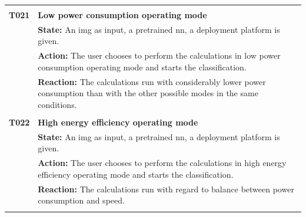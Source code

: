 \documentclass[parskip=full]{scrartcl}
\begin{document}
\begin{tabular}{p{2cm}p{12cm}}
& \\
\textbf{T021} & \textbf{Low power consumption operating mode}\\
& \textbf{State:} An \gls{img} as input, a pretrained \gls{nn}, a deployment platform is given.\\
& \textbf{Action:} The user chooses to perform the calculations in low power consumption operating mode and starts the classification.\\
& \textbf{Reaction:} The calculations run with considerably lower power consumption than with the other possible modes in the same conditions.\\
& \\
\textbf{T022} & \textbf{High energy efficiency operating mode}\\
& \textbf{State:} An \gls{img} as input, a pretrained \gls{nn}, a deployment platform is given.\\
& \textbf{Action:} The user chooses to perform the calculations in high energy efficiency operating mode and starts the classification.\\
& \textbf{Reaction:} The calculations run with regard to balance between power consumption and speed.\\
& \\
\end{tabular}
\newpage
\end{document}
